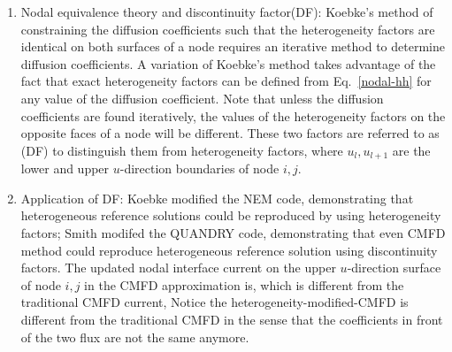 \documentclass{school-22.211-notes}
\begin{document}
\begin{enumerate}
\item Nodal equivalence theory and discontinuity factor(DF): Koebke's method of constraining the diffusion coefficients such that the heterogeneity factors are identical on both surfaces of a node requires an iterative method to determine diffusion coefficients. A variation of Koebke's method takes advantage of the fact that exact heterogeneity factors can be defined from Eq.~\ref{nodal-hh} for any value of the diffusion coefficient. Note that unless the diffusion coefficients are found iteratively, the values of the heterogeneity factors on the opposite faces of a node will be different. These two factors are referred to as (DF) to distinguish them from heterogeneity factors, 
  where $u_l, u_{l+1}$ are the lower and upper $u$-direction boundaries of node $i,j$. 

\item Application of DF: Koebke modified the NEM code, demonstrating that heterogeneous reference solutions could be reproduced by using heterogeneity factors; Smith modifed the QUANDRY code, demonstrating that even CMFD method could reproduce heterogeneous reference solution using discontinuity factors. The updated nodal interface current on the upper $u$-direction surface of node $i,j$ in the CMFD approximation is,
  which is different from the traditional CMFD current, 
  Notice the heterogeneity-modified-CMFD is different from the traditional CMFD in the sense that the coefficients in front of the two flux are not the same anymore. 


\end{enumerate}
\end{document}
